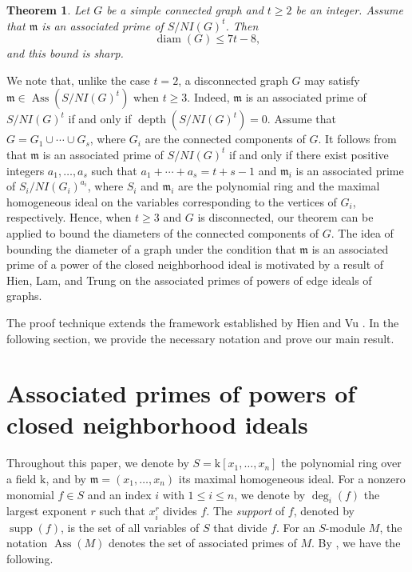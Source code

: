 \documentclass[12pt,reqno,twoside]{amsart}
\newcommand{\mm}{\mathfrak m}
\newcommand{\kk}{\mathrm k}
\DeclareMathOperator{\depth}{depth}
\DeclareMathOperator{\Ass}{Ass}
\DeclareMathOperator{\supp}{supp}
\newtheorem{thm}{\bf Theorem}[section]
\theoremstyle{definition}
\theoremstyle{plain}
\theoremstyle{remark}
\numberwithin{equation}{section}
\begin{document}
\begin{thm}\label{thm_diam}
Let $G$ be a simple connected graph and $t \ge 2$ be an integer. Assume that $\mathfrak{m}$ is an associated prime of $S/NI(G)^t$. Then 
\[
\operatorname{diam}(G) \le 7t - 8,
\]
and this bound is sharp.
\end{thm}

We note that, unlike the case $t = 2$, a disconnected graph $G$ may satisfy $\mathfrak{m} \in \operatorname{Ass}(S/NI(G)^t)$ when $t \geq 3$. Indeed, $\mm$ is an associated prime of $S/NI(G)^t$ if and only if $\depth(S/NI(G)^t) = 0$. Assume that $G = G_1 \cup \cdots \cup G_s$, where $G_i$ are the connected components of $G$. It follows from \cite[Theorem 1.1]{NV} that $\mm$ is an associated prime of $S/NI(G)^t$ if and only if there exist positive integers $a_1, \ldots, a_s$ such that $a_1 + \cdots + a_s = t + s - 1$ and $\mm_i$ is an associated prime of $S_i/NI(G_i)^{a_i}$, where $S_i$ and $\mm_i$ are the polynomial ring and the maximal homogeneous ideal on the variables corresponding to the vertices of $G_i$, respectively. Hence, when $t \geq 3$ and $G$ is disconnected, our theorem can be applied to bound the diameters of the connected components of $G$. The idea of bounding the diameter of a graph under the condition that $\mathfrak{m}$ is an associated prime of a power of the closed neighborhood ideal is motivated by a result of Hien, Lam, and Trung \cite[Proposition 2.6]{HLT} on the associated primes of powers of edge ideals of graphs.

The proof technique extends the framework established by Hien and Vu \cite{HV}. In the following section, we provide the necessary notation and prove our main result.

\section{Associated primes of powers of closed neighborhood ideals}
Throughout this paper, we denote by $S = \kk[x_1, \ldots, x_n]$ the polynomial ring over a field $\kk$, and by $\mm = (x_1, \ldots, x_n)$ its maximal homogeneous ideal. For a nonzero monomial $f \in S$ and an index $i$ with $1 \leq i \leq n$, we denote by $\deg_i(f)$ the largest exponent $r$ such that $x_i^r$ divides $f$. The \emph{support} of $f$, denoted by $\supp(f)$, is the set of all variables of $S$ that divide $f$. For an $S$-module $M$, the notation $\Ass(M)$ denotes the set of associated primes of $M$. By \cite[Lemma 2.3]{HV}, we have the following.
\end{document}
